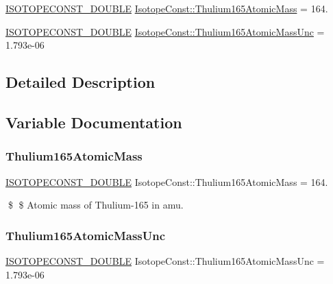 \begin{DoxyCompactItemize}
\item 
\mbox{\hyperlink{group___isotope_const-_macros_ga8f45a7272ce02c0b4c65c44636ed719a}{I\+S\+O\+T\+O\+P\+E\+C\+O\+N\+S\+T\+\_\+\+D\+O\+U\+B\+LE}} \mbox{\hyperlink{group___isotope_const-_thulium-_tm165_ga157c5f07ea4f2c2b6c170598caa36586}{Isotope\+Const\+::\+Thulium165\+Atomic\+Mass}} = 164.
\item 
\mbox{\hyperlink{group___isotope_const-_macros_ga8f45a7272ce02c0b4c65c44636ed719a}{I\+S\+O\+T\+O\+P\+E\+C\+O\+N\+S\+T\+\_\+\+D\+O\+U\+B\+LE}} \mbox{\hyperlink{group___isotope_const-_thulium-_tm165_gaaf8dc396fdfc3272d0cba4b9780c11bb}{Isotope\+Const\+::\+Thulium165\+Atomic\+Mass\+Unc}} = 1.\+793e-\/06
\end{DoxyCompactItemize}


\subsection{Detailed Description}


\subsection{Variable Documentation}
\mbox{\label{group___isotope_const-_thulium-_tm165_ga157c5f07ea4f2c2b6c170598caa36586}} 
\subsubsection{\texorpdfstring{Thulium165\+Atomic\+Mass}{Thulium165AtomicMass}}
{\footnotesize\ttfamily \mbox{\hyperlink{group___isotope_const-_macros_ga8f45a7272ce02c0b4c65c44636ed719a}{I\+S\+O\+T\+O\+P\+E\+C\+O\+N\+S\+T\+\_\+\+D\+O\+U\+B\+LE}} Isotope\+Const\+::\+Thulium165\+Atomic\+Mass = 164.}

\$ \$ Atomic mass of Thulium-\/165 in amu. \mbox{\label{group___isotope_const-_thulium-_tm165_gaaf8dc396fdfc3272d0cba4b9780c11bb}} 
\subsubsection{\texorpdfstring{Thulium165\+Atomic\+Mass\+Unc}{Thulium165AtomicMassUnc}}
{\footnotesize\ttfamily \mbox{\hyperlink{group___isotope_const-_macros_ga8f45a7272ce02c0b4c65c44636ed719a}{I\+S\+O\+T\+O\+P\+E\+C\+O\+N\+S\+T\+\_\+\+D\+O\+U\+B\+LE}} Isotope\+Const\+::\+Thulium165\+Atomic\+Mass\+Unc = 1.\+793e-\/06}


